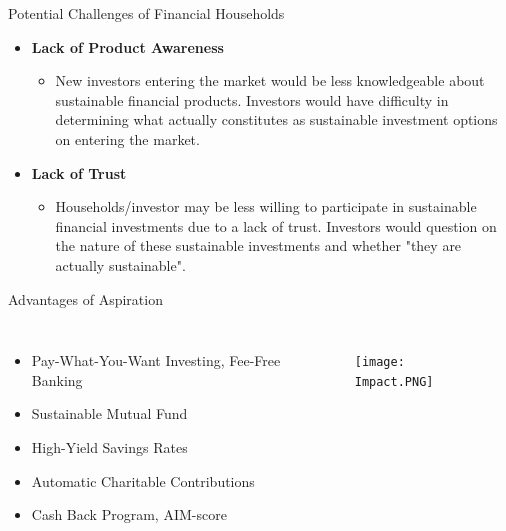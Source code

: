 \documentclass{beamer}
\begin{document}
\begin{frame}{Potential Challenges of Financial Households}
\begin{itemize}
\item \textbf{Lack of Product Awareness}
\begin{itemize} \item  New investors entering the market would be less knowledgeable about sustainable financial products. Investors would have difficulty in determining what actually constitutes as sustainable investment options on entering the market.  
\end{itemize}

\item \textbf{Lack of Trust} 
\begin{itemize}
    \item Households/investor may be less willing to participate in sustainable financial investments due to a lack of trust. Investors would question on the nature of these sustainable investments and whether "they are actually sustainable". 
\end{itemize}
\end{itemize}
\end{frame}


\begin{frame}{Advantages of Aspiration}
\begin{columns}
 
\begin{itemize}
\item Pay-What-You-Want Investing, Fee-Free Banking 
\item Sustainable Mutual Fund
\item High-Yield Savings Rates
\item Automatic Charitable Contributions
\item Cash Back Program, AIM-score
\end{itemize}

\begin{figure}[ht]

   

\begin{right}

\texttt{[image: Impact.PNG]}

\end{right}

\end{figure}
\end{columns}

\end{frame}
\end{document}
